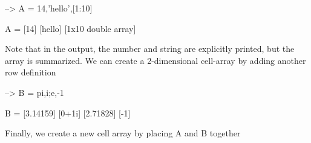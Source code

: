 \begin{DoxyVerbInclude}
--> A = {14,'hello',[1:10]}

A = 
 [14] [hello] [1x10 double array] 
\end{DoxyVerbInclude}


Note that in the output, the number and string are explicitly printed, but the array is summarized. We can create a 2-\/dimensional cell-\/array by adding another row definition


\begin{DoxyVerbInclude}
--> B = {pi,i;e,-1}

B = 
 [3.14159] [0+1i] 
 [2.71828] [-1] 
\end{DoxyVerbInclude}


Finally, we create a new cell array by placing {\ttfamily A} and {\ttfamily B} together



